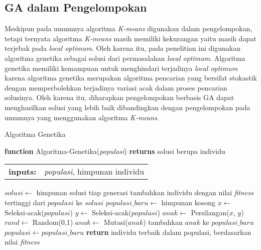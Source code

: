 \subsection{GA dalam Pengelompokan}
Meskipun pada umumnya algoritma \textit{K-means} digunakan dalam pengelompokan, tetapi ternyata algoritma \textit{K-means} masih memiliki kekurangan yaitu masih dapat terjebak pada \textit{local optimum}. Oleh karena itu, pada penelitian ini digunakan algoritma genetika sebagai solusi dari permasalahan \textit{local optimum}. Algoritma genetika memiliki kemampuan untuk menghindari terjadinya \textit{local optimum} karena algoritma genetika merupakan algoritma pencarian yang bersifat stokastik dengan memperbolehkan terjadinya variasi acak dalam proses pencarian solusinya. Oleh karena itu, diharapkan pengelompokan berbasis GA dapat menghasilkan solusi yang lebih baik dibandingkan dengan pengelompokan pada umumnya yang menggunakan algoritma \textit{K-means}.

\begin{algorithm}[!h]
	\caption{Algoritma Genetika\cite{russell2016artificial}}
	\label{alg:GA}
	\begin{flushleft}
		\textbf{function} Algoritma-Genetika(\textit{populasi}) \textbf{returns} solusi berupa individu
		\begin{flushleft}
			\begin{tabular}{ l l }
  				\textbf{inputs:} & \textit{populasi}, himpunan individu
			\end{tabular}
			\hspace{5pt}  
		\end{flushleft}
	\end{flushleft}
	\begin{algorithmic}[1]
		\STATE $solusi \leftarrow$ himpunan solusi tiap generasi
		\REPEAT
			\STATE tambahkan individu dengan nilai \textit{fitness} tertinggi dari $populasi$ ke $solusi$
			\STATE $populasi\_baru \leftarrow$ himpunan kosong %
				\STATE $x \leftarrow$ Seleksi-acak($populasi$)
				\STATE $y \leftarrow$ Seleksi-acak($populasi$)
				\STATE $anak \leftarrow$ Persilangan($x$, $y$)
				\STATE $rand \leftarrow$ Random(0,1)
					\STATE $anak \leftarrow$ Mutasi($anak$)
				\ENDIF
				\STATE tambahkan $anak$ ke $populasi\_baru$
			\ENDFOR
			\STATE $populasi \leftarrow populasi\_baru$
		\STATE \textbf{return} individu terbaik dalam populasi, berdasarkan nilai \textit{fitness}
	\end{algorithmic}
\end{algorithm}

